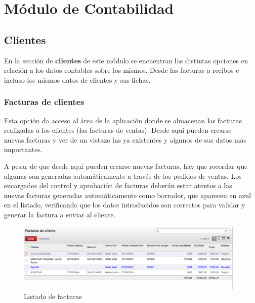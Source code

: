\chapter{Módulo de Contabilidad}


\section{Clientes}

En la sección de \textbf{clientes} de este módulo se encuentran las distintas opciones en relación a los datos contables sobre los mismos. Desde las facturas a recibos e incluso los mismos datos de clientes y sus fichas.

\subsection{Facturas de clientes}
Esta opción da acceso al área de la aplicación donde se almacenan las facturas realizadas a los clientes (las facturas de ventas). Desde aquí pueden crearse nuevas facturas y ver de un vistazo las ya existentes y algunos de sus datos más importantes.

A pesar de que desde aquí pueden crearse nuevas facturas, hay que recordar que algunas son generadas automáticamente a través de los pedidos de ventas. Los encargados del control y aprobación de facturas deberán estar atentos a las nuevas facturas generadas automáticamente como borrador, que aparecen en azul en el listado, verificando que los datos introducidos son correctos para validar y generar la factura a enviar al cliente.

\begin{figure}[H]
\includegraphics[width=\textwidth]{contabilidad/img/con_lisfact2.png}
\caption{Listado de facturas}
\label{con:lisfact}
\end{figure}


